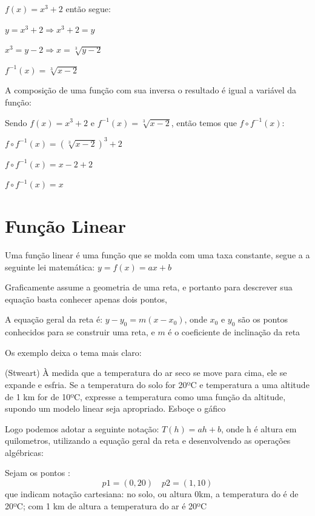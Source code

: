 \begin{multicols*}{2}
            $f(x) =x^3+2$ então segue:
            
            $y = x^3 +2 \Rightarrow x^3 +2 = y $		
            
            $x^3 = y - 2 \Rightarrow x = \sqrt[3]{y - 2}$
            
            $f^{-1}(x) = \sqrt[3]{x - 2}$
            
            A composição de uma função com sua inversa o resultado é igual a variável da função:
            
            Sendo $f(x) = x^3 +2$ e $f^{-1}(x) = \sqrt[3]{x - 2}$, então temos que $f \circ f^{-1}(x)$:
            
            $f \circ f^{-1}(x) = (\sqrt[3]{x - 2})^3 +2$ 
            
            $f \circ f^{-1}(x) = x -2 +2$
            
            $f \circ f^{-1}(x) = x$
            \section*{ Função Linear}
            Uma função linear é uma função que se molda com uma taxa constante, segue a a seguinte lei 				matemática: $y = f(x) = ax + b$
            
            Graficamente assume a geometria de uma reta, e portanto para descrever sua equação basta 				conhecer apenas dois pontos,
            
            A equação geral da reta é: $y - y_0 = m(x-x_0)$, onde $x_0$ e $y_0$ são os pontos conhecidos 			para se construir uma reta, e $m$ é o coeficiente de inclinação da reta
            
            Os exemplo deixa o tema mais claro:
            
            
            (Stweart) À medida que a temperatura do ar seco se move para cima, ele se expande e 					esfria. Se a temperatura do solo for 20ºC e temperatura a uma altitude de 1 km for de 10ºC, 			expresse a temperatura como uma função da altitude, supondo um modelo linear seja apropriado. 			Esboçe o gáfico
            
            Logo podemos adotar a seguinte notação: $T(h) = ah +b$, onde h é altura em quilometros, 				utilizando a equação geral da reta e desenvolvendo as operações algébricas:
            
            Sejam os pontos :
            \begin{equation}
            p1 = (0,20) \quad
            p2 = (1,10)
            \end{equation}
            que indicam notação cartesiana: no solo, ou altura 0km, a temperatura do é de 20ºC; com 1 km de 		altura a temperatura do ar é 20ºC
            

\end{multicols*}
